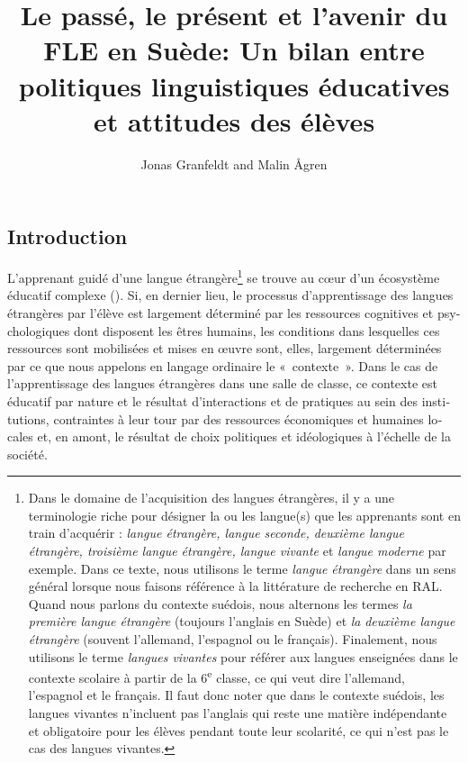\documentclass[french, output=paper]{langscibook}
\author{Jonas Granfeldt\orcid{}\affiliation{Université de Lund} and         Malin Ågren\orcid{}\affiliation{Université de Lund}}
\title[Le passé, le présent et l’avenir du FLE en Suède]{Le passé, le présent et l’avenir du FLE en Suède: Un bilan entre politiques linguistiques éducatives et attitudes des élèves}
\begin{document}
\begin{otherlanguage}{french}
\lsFrenchChapterSettings{}
\maketitle 



\section{Introduction}
\label{sec:granfeldt:1}

L’apprenant guidé d’une langue étrangère\footnote{Dans le domaine de l’acquisition des langues étrangères, il y a une terminologie riche pour désigner la ou les langue(s) que les apprenants sont en train d’acquérir : \textit{langue étrangère, langue seconde, deuxième langue étrangère, troisième langue étrangère, langue vivante} et \textit{langue moderne} par exemple. Dans ce texte, nous utilisons le terme \textit{langue étrangère} dans un sens général lorsque nous faisons référence à la littérature de recherche en RAL. Quand nous parlons du contexte suédois, nous alternons les termes \textit{la première langue étrangère} (toujours l’anglais en Suède) et \textit{la} \textit{deuxième langue étrangère} (souvent l’allemand, l’espagnol ou le français). Finalement, nous utilisons le terme \textit{langues vivantes} pour référer aux langues enseignées dans le contexte scolaire à partir de la 6\textsuperscript{e} classe, ce qui veut dire l’allemand, l’espagnol et le français. Il faut donc noter que dans le contexte suédois, les langues vivantes n’incluent pas l’anglais qui reste une matière indépendante et obligatoire pour les élèves pendant toute leur scolarité, ce qui n’est pas le cas des langues vivantes.}  se trouve au cœur d’un écosystème éducatif complexe (\citealt{BeaccoEtAl2005, MazièresVéronique2021}). Si, en dernier lieu, le processus d’apprentissage des langues étrangères par l’élève est largement déterminé par les ressources cognitives et psychologiques dont disposent les êtres humains, les conditions dans lesquelles ces ressources sont mobilisées et mises en œuvre sont, elles, largement déterminées par ce que nous appelons en langage ordinaire le «~contexte~». Dans le cas de l’apprentissage des langues étrangères dans une salle de classe, ce contexte est éducatif par nature et le résultat d’interactions et de pratiques au sein des institutions, contraintes à leur tour par des ressources économiques et humaines locales et, en amont, le résultat de choix politiques et idéologiques à l’échelle de la société.


\end{otherlanguage}
\end{document}
